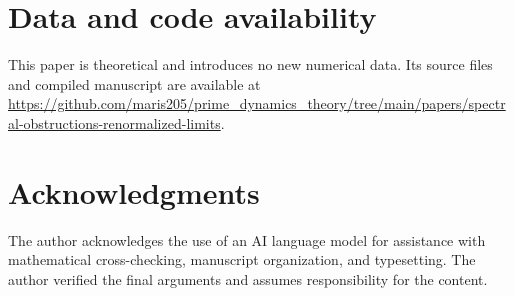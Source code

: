 \documentclass[11pt]{article}
\theoremstyle{definition}
\theoremstyle{remark}
\begin{document}
\section*{Data and code availability}

This paper is theoretical and introduces no new numerical data.  Its source files and compiled manuscript are available at
\url{https://github.com/maris205/prime_dynamics_theory/tree/main/papers/spectral-obstructions-renormalized-limits}.

\section*{Acknowledgments}

The author acknowledges the use of an AI language model for assistance with mathematical cross-checking, manuscript organization, and typesetting.  The author verified the final arguments and assumes responsibility for the content.

{\small


}
\end{document}
